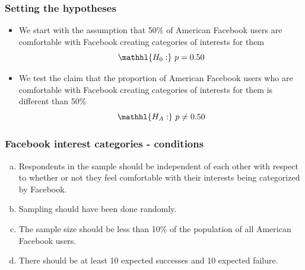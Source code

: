  
\begin{frame}
\frametitle{Setting the hypotheses}

\begin{itemize}

\item We start with the assumption that 50\% of American Facebook users are comfortable with Facebook creating categories of interests for them
\[ \mathhl{H_0:}~p = 0.50 \]

\pause

\item We test the claim that the proportion of American Facebook users who are comfortable with Facebook creating categories of interests for them is different than 50\%
\[ \mathhl{H_A:}~p \ne 0.50 \]

\end{itemize}

\end{frame}


\begin{frame}
\frametitle{Facebook interest categories - conditions}


\begin{enumerate}[(a)]
\item Respondents in the sample should be independent of each other with respect to whether or not they feel comfortable with their interests being categorized by Facebook.
\item Sampling should have been done randomly.
\item The sample size should be less than 10\% of the population of all American Facebook users.
\item There should be at least 10 expected successes and 10 expected failure.
\end{enumerate}

\end{frame}

 
